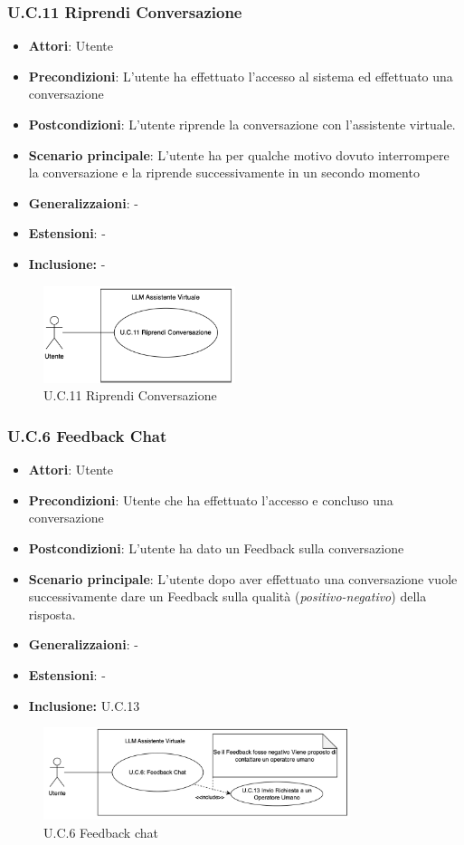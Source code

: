\subsubsection{U.C.11 Riprendi Conversazione}
\begin{itemize}
    \item \textbf{Attori}: Utente
    \item \textbf{Precondizioni}: L’utente ha effettuato l’accesso al sistema ed effettuato una conversazione
    \item \textbf{Postcondizioni}: L’utente riprende la conversazione con l’assistente virtuale.
    \item \textbf{Scenario principale}: L’utente ha per qualche motivo dovuto interrompere la conversazione e la riprende successivamente in un secondo momento
    \item \textbf{Generalizzaioni}: -
    \item \textbf{Estensioni}: -
    \item \textbf{Inclusione:} -
\end{itemize}
\begin{figure}[h!]
    \centering
    \includegraphics[width=0.5\textwidth]{img/UC11.png}
    \caption{U.C.11 Riprendi Conversazione}
\end{figure}
\subsubsection{U.C.6 Feedback Chat}
\begin{itemize}
    \item \textbf{Attori}: Utente
    \item \textbf{Precondizioni}: Utente che ha effettuato l'accesso e concluso una conversazione
    \item \textbf{Postcondizioni}: L'utente ha dato un Feedback sulla conversazione
    \item \textbf{Scenario principale}: L'utente dopo aver effettuato una conversazione vuole successivamente dare un Feedback sulla qualità (\textit{positivo-negativo}) della risposta.
    \item \textbf{Generalizzaioni}: -
    \item \textbf{Estensioni}: -
    \item \textbf{Inclusione:} U.C.13
\end{itemize}
\begin{figure}[h!]
    \centering
    \includegraphics[width=0.8\textwidth]{img/UC6.png}
    \caption{U.C.6 Feedback chat}
\end{figure}
